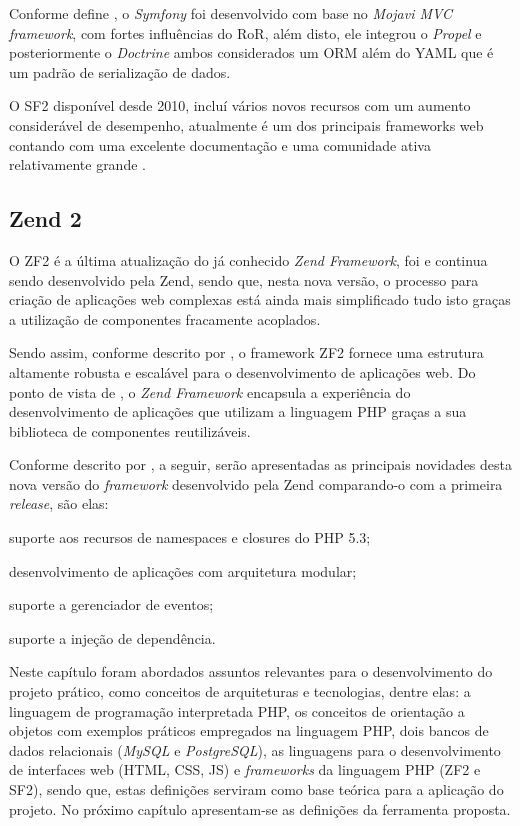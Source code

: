 Conforme define
, o
\textit{Symfony} foi desenvolvido com base no \textit{Mojavi MVC framework},
com fortes influências do \ac{RoR}, além disto, ele integrou o \textit{Propel} e
posteriormente o \textit{Doctrine} ambos considerados um \ac{ORM} além do
\ac{YAML} que é um padrão de serialização de dados.

O \ac{SF2} disponível desde 2010, incluí vários novos recursos com um aumento
considerável de desempenho, atualmente é um dos principais frameworks web
contando com uma excelente documentação e uma comunidade ativa relativamente
grande \cite{buildingPHPApplicationsWithSymfonyCakePHPAndZendFramework}.

\subsection{Zend 2}

O \ac{ZF2} é a última atualização do já conhecido \textit{Zend
Framework}, foi e continua sendo desenvolvido pela \acs{Zend}, sendo que, nesta
nova versão, o processo para criação de aplicações web complexas está ainda mais
simplificado tudo isto graças a utilização de componentes fracamente acoplados.

Sendo assim, conforme descrito por
, o framework \acs{ZF2}
fornece uma estrutura altamente robusta e escalável para o desenvolvimento de 
aplicações web. Do ponto de vista de
, o 
\textit{Zend Framework} encapsula a experiência do desenvolvimento de aplicações
que utilizam a linguagem \acs{PHP} graças a sua biblioteca de componentes 
reutilizáveis.

Conforme descrito por , a
seguir, serão apresentadas as principais novidades desta nova versão do 
\textit{framework} desenvolvido pela \acs{Zend} comparando-o com a primeira
\textit{release}, são elas:

\begin{alineas}
    \item suporte aos recursos de namespaces e closures do \acs{PHP} 5.3;
    \item desenvolvimento de aplicações com arquitetura modular;
    \item suporte a gerenciador de eventos;
    \item suporte a injeção de dependência.
\end{alineas}

Neste capítulo foram abordados assuntos relevantes para o
desenvolvimento do projeto prático, como conceitos de arquiteturas e
tecnologias, dentre elas: a linguagem de programação interpretada \acs{PHP},
os conceitos de orientação a objetos com exemplos práticos empregados na
linguagem \acs{PHP}, dois bancos de dados relacionais (\textit{MySQL} e
\textit{PostgreSQL}), as linguagens para o desenvolvimento de interfaces web
(\acs{HTML}, \acs{CSS}, \acs{JS}) e \textit{frameworks} da linguagem
\acs{PHP}  (\acs{ZF2} e \acs{SF2}), sendo que, estas definições
serviram como base teórica para a aplicação do projeto. No próximo capítulo 
apresentam-se as definições da ferramenta proposta.
